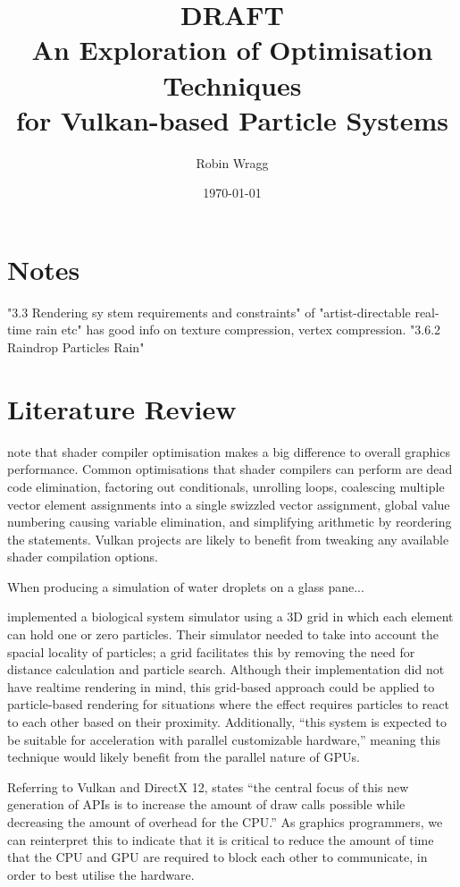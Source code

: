 \documentclass[11pt, a4paper, twocolumn]{article}
\title{\sffamily\bfseries DRAFT\\An Exploration of Optimisation Techniques\\for Vulkan-based Particle Systems}
\author{Robin Wragg}
\date{\today}
\begin{document}
\maketitle

\section{Notes}
"3.3 Rendering sy stem requirements and constraints" of "artist-directable real-time rain etc" has good info on texture compression, vertex compression.
"3.6.2 Raindrop Particles Rain"


\section{Literature Review}
\citet{Crawford2018} note that shader compiler optimisation makes a big difference to overall graphics performance. Common optimisations that shader compilers can perform are dead code elimination, factoring out conditionals, unrolling loops, coalescing multiple vector element assignments into a single swizzled vector assignment, global value numbering causing variable elimination, and simplifying arithmetic by reordering the statements. Vulkan projects are likely to benefit from tweaking any available shader compilation options.

When producing a simulation of water droplets on a glass pane... \citet{Chen2012}

\citet{Boulianne2007} implemented a biological system simulator using a 3D grid in which each element can hold one or zero particles. Their simulator needed to take into account the spacial locality of particles; a grid facilitates this by removing the need for distance calculation and particle search. Although their implementation did not have realtime rendering in mind, this grid-based approach could be applied to particle-based rendering for situations where the effect requires particles to react to each other based on their proximity. Additionally, ``this system is expected to be suitable for acceleration with parallel customizable hardware,'' \citep{Boulianne2007} meaning this technique would likely benefit from the parallel nature of GPUs.



Referring to Vulkan and DirectX 12, \citet{Joseph2016} states ``the central focus of this new generation of APIs is to increase the amount of draw calls possible while decreasing the amount of overhead for the CPU.'' As graphics programmers, we can reinterpret this to indicate that it is critical to reduce the amount of time that the CPU and GPU are required to block each other to communicate, in order to best utilise the hardware.
\end{document}
